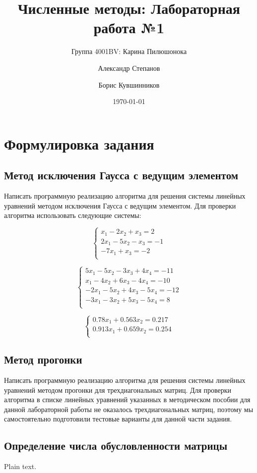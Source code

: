 \documentclass{article}
\title{Численные методы: Лабораторная работа №1}
\author{Группа 4001BV: Карина Пилюшонока \and Александр Степанов \and Борис
Кувшинников}
\date \today
\begin{document}
\maketitle
\newpage
\tableofcontents
\newpage
\section{Формулировка задания}

\subsection{Метод исключения Гаусса с ведущим элементом}
Написать программную реализацию алгоритма для решения системы линейных
уравнений методом исключения Гаусса с ведущим элементом.
Для проверки алгоритма использовать следующие системы:

\begin{equation}\label{1st}
\left\{ \begin{array}{ll}
x_{1} - 2x_{2} + x_{3} = 2\\
2x_{1} - 5x_{2} - x_{3} = -1\\
-7x_{1} + x_{3} = -2\\
\end{array} \right.
\end{equation}

\begin{equation}\label{2st}
\left\{ \begin{array}{ll}
5x_{1} - 5x_{2} - 3x_{3} + 4x_{4} = -11\\
x_{1} - 4x_{2} + 6x_{3} - 4x_{4} = -10\\
-2x_{1} - 5x_{2} + 4x_{3} - 5x_{4} = -12\\
-3x_{1} - 3x_{2} + 5x_{3} - 5x_{4} = 8\\
\end{array} \right.
\end{equation}

\begin{equation}\label{3d}
\left\{ \begin{array}{ll}
0.78x_{1} + 0.563x_{2} = 0.217\\
0.913x_{1} + 0.659x_{2} = 0.254\\
\end{array} \right.
\end{equation}

\subsection{Метод прогонки}
Написать программную реализацию алгоритма для решения системы линейных
уравнений методом прогонки для трехдиагональных матриц.
Для проверки алгоритма в списке линейных уравнений указанных в методическом
пособии для данной лабораторной работы не оказалось трехдиагональных матриц,
поэтому мы самостоятельно подготовили тестовые варианты для данной
части задания.


\subsection{Определение числа обусловленности матрицы}

Plain text.
\end{document}
